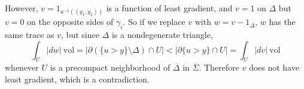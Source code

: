\documentclass[reqno,12pt,letterpaper]{amsart}
\newcommand{\vol}{\mathrm{vol}}
\theoremstyle{definition}
\numberwithin{equation}{section}
\begin{document}
However, $v = 1_{u^{-1}((y_1, y_2))}$ is a function of least gradient, and $v = 1$ on $\Delta$ but $v = 0$ on the opposite sides of $\gamma_i$.
So if we replace $v$ with $w = v - 1_\Delta$, $w$ has the same trace as $v$, but since $\Delta$ is a nondegenerate triangle,
$$\int_U |dw| ~\vol = |\partial(\{u > y\} \setminus \Delta) \cap U| < |\partial \{u > y\} \cap U| = \int_U |dv| ~\vol$$
whenever $U$ is a precompact neighborhood of $\overline \Delta$ in $\overline \Sigma$.
Therefore $v$ does not have least gradient, which is a contradiction.





\printbibliography
\end{document}
